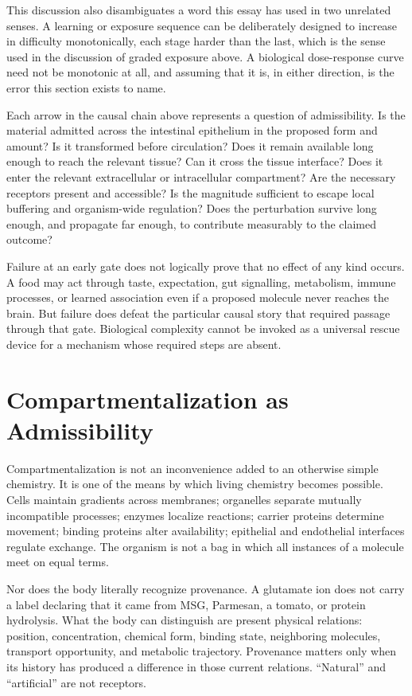 \documentclass[11pt]{article}
\begin{document}
This discussion also disambiguates a word this essay has used in two unrelated senses. A learning or exposure sequence can be deliberately designed to increase in difficulty monotonically, each stage harder than the last, which is the sense used in the discussion of graded exposure above. A biological dose-response curve need not be monotonic at all, and assuming that it is, in either direction, is the error this section exists to name.

Each arrow in the causal chain above represents a question of admissibility. Is the material admitted across the intestinal epithelium in the proposed form and amount? Is it transformed before circulation? Does it remain available long enough to reach the relevant tissue? Can it cross the tissue interface? Does it enter the relevant extracellular or intracellular compartment? Are the necessary receptors present and accessible? Is the magnitude sufficient to escape local buffering and organism-wide regulation? Does the perturbation survive long enough, and propagate far enough, to contribute measurably to the claimed outcome?

Failure at an early gate does not logically prove that no effect of any kind occurs. A food may act through taste, expectation, gut signalling, metabolism, immune processes, or learned association even if a proposed molecule never reaches the brain. But failure does defeat the particular causal story that required passage through that gate. Biological complexity cannot be invoked as a universal rescue device for a mechanism whose required steps are absent.

\section{Compartmentalization as Admissibility}

Compartmentalization is not an inconvenience added to an otherwise simple chemistry. It is one of the means by which living chemistry becomes possible. Cells maintain gradients across membranes; organelles separate mutually incompatible processes; enzymes localize reactions; carrier proteins determine movement; binding proteins alter availability; epithelial and endothelial interfaces regulate exchange. The organism is not a bag in which all instances of a molecule meet on equal terms.

Nor does the body literally recognize provenance. A glutamate ion does not carry a label declaring that it came from MSG, Parmesan, a tomato, or protein hydrolysis. What the body can distinguish are present physical relations: position, concentration, chemical form, binding state, neighboring molecules, transport opportunity, and metabolic trajectory. Provenance matters only when its history has produced a difference in those current relations. ``Natural'' and ``artificial'' are not receptors.
\end{document}
